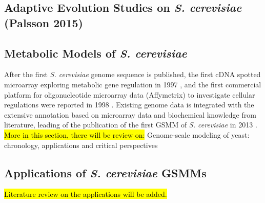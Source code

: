 \subsection{Adaptive Evolution Studies on \emph{S. cerevisiae} (Palsson 2015)}

\subsection{Metabolic Models of \emph{S. cerevisiae}}
After the first \emph{S. cerevisiae} genome sequence is published, the first cDNA spotted microarray exploring metabolic gene regulation in 1997 \cite{derisi1997exploring}, and the first commercial platform for oligonucleotide microarray data (Affymetrix) to investigate cellular regulations were reported in 1998 \cite{cho1998parallel}. Existing genome data is integrated with the extensive annotation based on microarray data and biochemical knowledge from literature, leading of the publication of the first GSMM of \emph{S. cerevisiae} in 2013 \cite{forster2003genome}.   \hl{More in this section, there will be review on:} Genome-scale modeling of yeast: chronology, applications and critical perspectives \cite{lopes2017genome}

\subsection{Applications of \emph{S. cerevisiae} GSMMs}
 \hl{Literature review on the applications will be added.}

